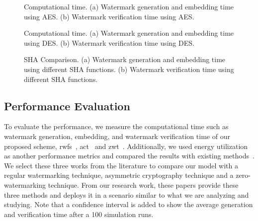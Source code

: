 \documentclass{llncs}
\begin{document}
\begin{figure*}[!htbp]
  \centering
  \caption{Computational time. (a) Watermark generation and embedding time using AES. (b) Watermark verification time using AES.}
\end{figure*}

\begin{figure*}[!htbp]
  \centering
  \caption{Computational time. (a) Watermark generation and embedding time using DES. (b) Watermark verification time using DES.}
\end{figure*}

\begin{figure*}[!htbp]
  \centering
  \caption{SHA Comparison. (a) Watermark generation and embedding time using different SHA functions. (b) Watermark verification time using different SHA functions. }
\end{figure*}



\subsection{Performance Evaluation}
To evaluate the performance, we measure the computational time such as watermark generation, embedding, and watermark verification time of our proposed scheme, \gls*{rwfs}~\cite{Alromith2018}, \gls*{act}~\cite{Sun2013} and \gls*{zwt}~\cite{hameed2018}. Additionally, we used energy utilization as another performance metrics and compared the results with existing methods~\cite{Alromith2018,Sun2013,hameed2018}. We select these three works from the literature to compare our model with a regular watermarking technique, asymmetric cryptography technique and a zero-watermarking technique. From our research work, these papers provide these three methods and deploys it in a scenario similar to what we are analyzing and studying. Note that a confidence interval is added to show the average generation and verification time after a 100 simulation runs.
\end{document}
